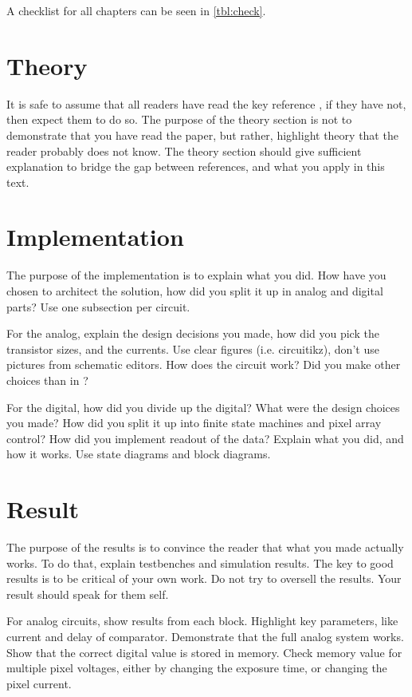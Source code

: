 \documentclass[paper,10pt,a4paper]{IEEEtran}
\begin{document}
A checklist for all chapters can be seen in \ref{tbl:check}.

\section{Theory}
It is safe to assume that all readers have read the key reference
\cite{klein01}, if they have not, then expect them to do so. The purpose of the
theory section is not to demonstrate that you have read the paper, but rather,
highlight theory that the reader probably does not know. The theory section
should give sufficient explanation to bridge the gap between references, and
what you apply in this text.

\section{Implementation}
The purpose of the implementation is to explain what you did. How have you
chosen to architect the solution, how did you split it up in analog and digital
parts? Use one subsection per circuit.

For the analog, explain the design decisions you made, how did you pick the transistor sizes,
and the currents. Use clear figures (i.e. circuitikz),
don't use pictures from schematic editors. How does the circuit work? Did you make other choices than in
\cite{klein01}?

For the digital, how did you divide up the digital? What were the design choices you made? How
did you split it up into finite state machines and pixel array control? How did
you implement readout of the data? Explain what you did, and how it works. Use
state diagrams and block diagrams.

\section{Result}
The purpose of the results is to convince the reader that what you made
actually works. To do that, explain testbenches and simulation results.
The key to good results is to be critical of your own work. Do not try to oversell
the results. Your result should speak for them self.

For analog circuits, show results from each block. Highlight key
parameters, like current and delay of comparator. Demonstrate that the full analog system works. Show that the correct
digital value is stored in memory. Check memory value for multiple pixel voltages, either by
changing the exposure time, or changing the pixel current.
\end{document}
